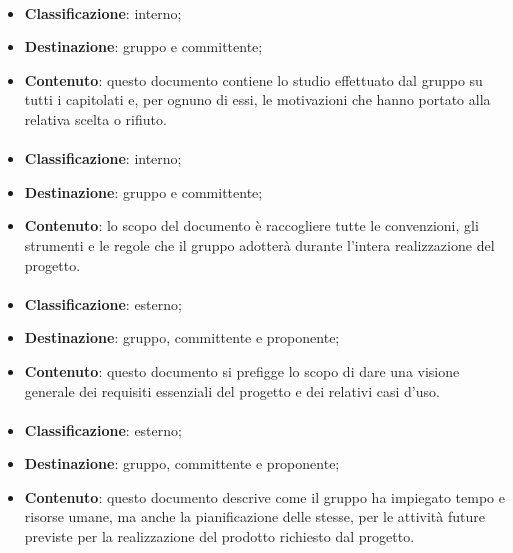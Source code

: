 			\paragraph{\SdF}
			\begin{itemize}
				\item \textbf{Classificazione}: interno;
				\item \textbf{Destinazione}: gruppo e committente;
				\item \textbf{Contenuto}: questo documento contiene lo studio effettuato dal gruppo \textit{\gruppo} su tutti i capitolati e, per ognuno di essi, le motivazioni che hanno portato alla relativa scelta o rifiuto.
			\end{itemize}

			\paragraph{\NdP}
			\begin{itemize}
				\item \textbf{Classificazione}: interno;
				\item \textbf{Destinazione}: gruppo e committente;
				\item \textbf{Contenuto}: lo scopo del documento è raccogliere tutte le convenzioni, gli strumenti e le regole che il gruppo \textit{\gruppo} adotterà durante l'intera realizzazione del progetto. 
			\end{itemize}	

			\paragraph{\AdR}
			\begin{itemize}
				\item \textbf{Classificazione}: esterno;
				\item \textbf{Destinazione}: gruppo, committente e proponente;
				\item \textbf{Contenuto}: questo documento si prefigge lo scopo di dare una visione generale dei requisiti essenziali del progetto e dei relativi casi d'uso.
			\end{itemize}

			\paragraph{\PdP}
			\begin{itemize}
				\item \textbf{Classificazione}: esterno;
				\item \textbf{Destinazione}: gruppo, committente e proponente;
				\item \textbf{Contenuto}: questo documento descrive come il gruppo \textit{\gruppo} ha impiegato tempo e risorse umane, ma anche la pianificazione delle stesse, per le attività future previste per la realizzazione del prodotto richiesto dal progetto.
			\end{itemize}

